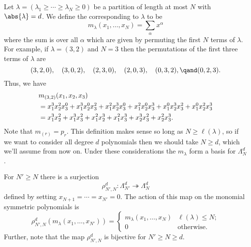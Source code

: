 Let \(\lambda = (\lambda_1 \ge \dotsb \ge \lambda_N \ge 0)\) be a partition of length at most \(N\) with \(\abs{\lambda} = d\).
We define the  corresponding to \(\lambda\) to be
\begin{equation}
    m_\lambda(x_1, \dotsc, x_N) = \sum_{\alpha} x^\alpha
\end{equation}
where the sum is over all \(\alpha\) which are given by permuting the first \(N\) terms of \(\lambda\).
For example, if \(\lambda = (3,2)\) and \(N = 3\) then the permutations of the first three terms of \(\lambda\) are
\begin{equation}
    (3, 2, 0), \quad (3, 0, 2),\quad (2, 3, 0), \quad (2, 0, 3), \quad (0, 3, 2), \qand (0, 2, 3).
\end{equation}
Thus, we have
\begin{align}
    &m_{(3,2)}(x_1, x_2, x_3)\\
    &= x_1^3 x_2^2 x_3^0 + x_1^3 x_2^0 x_3^2 + x_1^2 x_2^3 x_3^0 + x_1^2 x_2^0 x_3^3 + x_1^0 x_2^3 x_3^2 + x_1^0 x_2^2 x_3^3 \notag\\
    &= x_1^3 x_2^2 + x_1^3 x_3^2 + x_1^2 x_2^3 + x_1^2 x_3^3 + x_2^3 x_3^2 + x_2^2 x_3^3. \notag
\end{align}
Note that \(m_{(r)} = p_r\).
This definition makes sense so long as \(N \ge \ell(\lambda)\), so if we want to consider all degree \(d\) polynomials then we should take \(N \ge d\), which we'll assume from now on.
Under these considerations the \(m_\lambda\) form a basis for \(\Lambda_N^d\).

For \(N' \ge N\) there is a surjection
\begin{equation}
    \rho_{N',N}^d \colon \Lambda_{N'}^d \twoheadrightarrow \Lambda_N^d
\end{equation}
defined by setting \(x_{N+1} = \dotsb = x_{N'} = 0\).
The action of this map on the monomial symmetric polynomials is
\begin{equation}
    \rho_{N',N}^d(m_\lambda(x_1, \dotsc, x_{N'})) = 
    \begin{cases}
        m_\lambda(x_1, \dotsc, x_N) & \ell(\lambda) \le N;\\
        0 & \text{otherwise}.
    \end{cases}
\end{equation}
Further, note that the map \(\rho_{N',N}^d\) is bijective for \(N' \ge N \ge d\).

